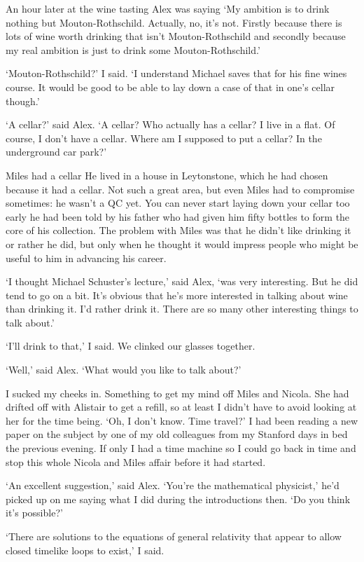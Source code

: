 \scenebreak
An hour later at the wine tasting Alex was saying `My ambition is to drink nothing but
Mouton-Rothschild. Actually, no, it's not. Firstly because there is
lots of wine worth drinking that isn't Mouton-Rothschild and
secondly because my real ambition is just to drink some
Mouton-Rothschild.'

`Mouton-Rothschild?' I said. `I understand Michael saves that for his fine wines course. It would be good to be able to lay down a case of that in
one's cellar though.'

`A cellar?' said Alex. `A cellar? Who actually has a cellar? I live in a flat. Of
course, I don't have a cellar. Where am I supposed to put a cellar?
In the underground car park?'

Miles had a cellar He lived in a house in Leytonstone, which he had chosen because it had a cellar. Not {\twelveit such\/} a great area, but even Miles had to
compromise sometimes: he wasn't a QC yet. You can never start laying down your cellar
too early he had been told by his father who had given him fifty bottles to form  the core of his collection. The problem with Miles was that he
didn't like drinking it or rather he did, but only when he thought it would impress people who might be useful to him in advancing his career.

`I thought Michael Schuster's lecture,' said Alex, `was very interesting. But he did tend to
go on a bit. It's obvious that he's more interested in talking about
wine than drinking it. I'd rather drink it. There are so many other
interesting things to talk about.'

`I'll drink to that,' I said. We clinked our glasses together.

`Well,' said Alex. `What would you like to talk about?'

I sucked my cheeks in. Something to get my mind off Miles and Nicola. She had drifted off with Alistair to get a refill, so at least I didn't have to avoid looking at her for the time being. `Oh, I don't know. Time
travel?' I had been reading a new paper on the subject by one of my old
colleagues from my Stanford days in bed the previous evening. If only I had a time machine so I could go back in time and stop this whole Nicola and Miles affair before it had started.

`An excellent suggestion,' said Alex. `You're the mathematical physicist,' he'd picked up on me saying what I did during the introductions then. `Do you think it's possible?'

`There are solutions to the equations of general relativity that
appear to allow closed timelike loops to exist,' I said.

